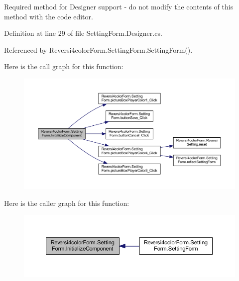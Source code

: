Required method for Designer support -\/ do not modify the contents of this method with the code editor. 



Definition at line 29 of file Setting\+Form.\+Designer.\+cs.



Referenced by Reversi4color\+Form.\+Setting\+Form.\+Setting\+Form().

Here is the call graph for this function\+:
\nopagebreak
\begin{figure}[H]
\begin{center}
\leavevmode
\includegraphics[width=350pt]{class_reversi4color_form_1_1_setting_form_a16ffb6338dd99bb75b8b52e8df9fe271_cgraph}
\end{center}
\end{figure}
Here is the caller graph for this function\+:
\nopagebreak
\begin{figure}[H]
\begin{center}
\leavevmode
\includegraphics[width=350pt]{class_reversi4color_form_1_1_setting_form_a16ffb6338dd99bb75b8b52e8df9fe271_icgraph}
\end{center}
\end{figure}
\mbox{\label{class_reversi4color_form_1_1_setting_form_a23d56ca250e5a1e9df3895e24ed86a76}} 
